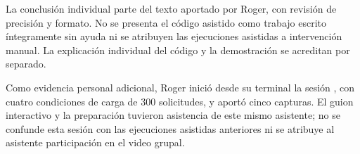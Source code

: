 La conclusión individual parte del texto aportado por Roger, con revisión de
precisión y formato. No se presenta el código asistido como trabajo escrito
íntegramente sin ayuda ni se atribuyen las ejecuciones asistidas a intervención
manual. La explicación individual del código y la demostración se acreditan
por separado.


Como evidencia personal adicional, Roger inició desde su terminal la sesión
, con cuatro condiciones de carga de 300
solicitudes, y aportó cinco capturas. El guion interactivo y la preparación
tuvieron asistencia de este mismo asistente; no se confunde esta sesión con
las ejecuciones asistidas anteriores ni se atribuye al asistente participación
en el video grupal.
